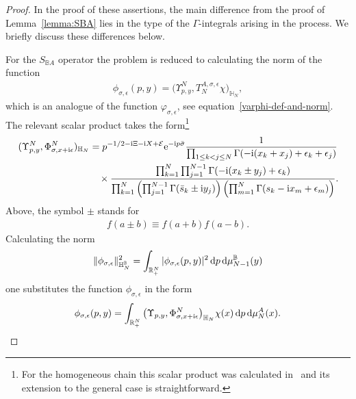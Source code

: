 \documentclass[pdftex]{sigma}%
\numberwithin{equation}{section}
\begin{document}
\begin{proof}
In the proof of these assertions, the main difference from the proof of Lemma~\ref{lemma:SBA} lies in the type of the $\Gamma$-integrals
arising in the process. We briefly discuss these differences below.



For the $S_{\mathbb B A}$ operator the problem is reduced to calculating the norm of the function
\begin{gather*}
\phi_{\sigma,\epsilon}(p,y)= \big( \Upsilon^N_{p,y},T_N^{A,\sigma,\epsilon}\chi \big)_{ \mathbb{H}_N },
\end{gather*}
which is an analogue of the function $\varphi_{\sigma,\epsilon}$, see equation~\eqref{varphi-def-and-norm}. The relevant scalar product takes the
form\footnote{For the homogeneous chain this scalar product was calculated in~\cite{DMspinchainandSL2RGustafson} and its extension to the
general case is straightforward.}
\begin{gather*}
(\Upsilon^N_{p,y},\Phi^N_{\sigma,x+{\rm i}\epsilon})_{ \mathbb{H}_N }
= p^{-1/2 -{\rm i}\Xi-{\rm i}X+\mathcal E}{\rm e}^{-{\rm i}p\bar\sigma}
\frac1{ \prod_{1\leq k<j\leq N}\Gamma(-{\rm i}( x_k+ x_j)+\epsilon_k+\epsilon_j) }
\\ \hphantom{(\Upsilon^N_{p,y},\Phi^N_{\sigma,x+{\rm i}\epsilon})_{ \mathbb{H}_N }=}
{}\times \frac{\prod_{k=1}^{N}\prod_{j=1}^{N-1} \Gamma(-{\rm i}(x_k\pm y_j)+\epsilon_k)}{
\prod_{k=1}^N\left(\prod_{j=1}^{N-1} \Gamma(\bar s_k\pm {\rm i}y_j)\right) \left(\prod_{m=1}^{N}\Gamma( s_k-{\rm i}x_m+\epsilon_m)\right)}.
\end{gather*}
 Above, the symbol $\pm$ stands for
\begin{gather*}
f(a \pm b) \equiv f(a+b)f(a-b) .
\end{gather*}
Calculating the norm
\begin{gather*}
\|\phi_{\sigma,\epsilon}\|^2_{\mathbb H_N^{\mathbb B}} =\int_{\mathbb R_+^N}
 |\phi_{\sigma,\epsilon}(p,y)|^2 \,{\rm d}p \,{\rm d}\mu_{N-1}^{\mathbb B}(y)
\end{gather*}
one substitutes the function $\phi_{\sigma,\epsilon}$ in the form
\begin{gather*}
\phi_{\sigma,\epsilon}(p,y)=\int_{\mathbb R_+^N} \big( \Upsilon_{p,y},\Phi^N_{\sigma,x+{\rm i}\epsilon}\big)_{ \mathbb{H}_N } \chi(x) \,{\rm d}p\,{\rm d}\mu_N^A(x).
\end{gather*}

\end{proof}
\end{document}

